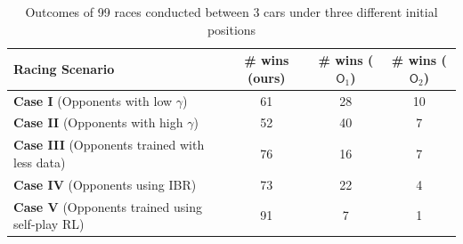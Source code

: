 \begin{table}[htbp] 
\centering
\begin{tabular}{|l|c|c|c|}
\hline
\textbf{Racing Scenario}              & \textbf{\# wins (ours)} & \textbf{\# wins ($\textsf{O}_1$)} & \textbf{\# wins ($\textsf{O}_2$)} \\ \hline
\textbf{Case I} (Opponents with low $\gamma$) & 61    & 28 & 10                   \\ \hline
\textbf{Case II} (Opponents with high $\gamma$)
& 52    & 40 & 7                   \\ \hline
\textbf{Case III} (Opponents trained with less data)
& 76    & 16 & 7  \\ 
\hline
\textbf{Case IV} (Opponents using IBR)
& 73    & 22 & 4                   \\ \hline
\textbf{Case V} (Opponents trained using self-play RL)
& 91    & 7 & 1                    \\ \hline
\end{tabular}
\caption{Outcomes of 99 races conducted between 3 cars under three different initial positions}
\label{tab:3_agents}
\vspace{-3mm}
\end{table}


